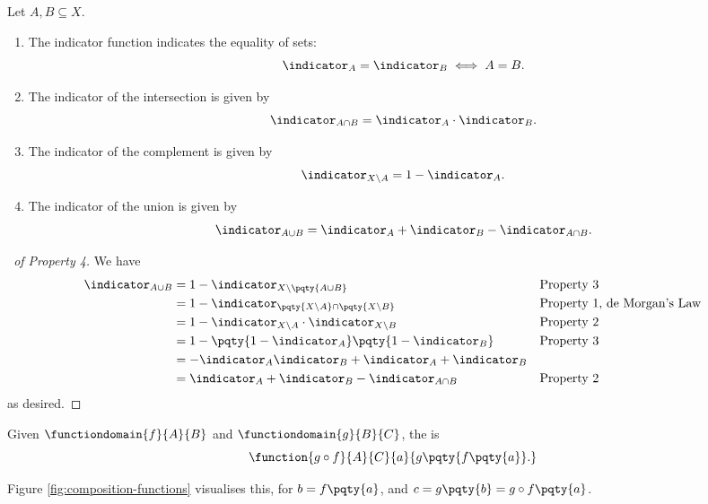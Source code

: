 \begin{proposition}
    Let \(A, B \subseteq X\).
    \begin{enumerate}
        \item The indicator function indicates the equality of sets:
        \[
            \indicator_A = \indicator_B \iff A = B.
        \]
        \item The indicator of the intersection is given by
        \[
            \indicator_{A \cap B} = \indicator_A \cdot \indicator_B.
        \]
        \item The indicator of the complement is given by
        \[
            \indicator_{X \setminus A} = 1 - \indicator_{A}.
        \]
        \item The indicator of the union is given by
        \[
            \indicator_{A \cup B} = \indicator_A + \indicator_B - \indicator_{A \cap B}.
        \]
    \end{enumerate}
\end{proposition}

\begin{proof}[\proofname\ of Property 4]
    We have
    \begin{align*}
        \indicator_{A \cup B} &= 1 - \indicator_{X \setminus \pqty{A \cup B}} && \text{Property 3} \\
        &= 1 - \indicator_{\pqty{X \setminus A} \cap \pqty{X \setminus B}} && \text{Property 1, de Morgan's Law} \\
        &= 1 - \indicator_{X \setminus A} \cdot \indicator_{X \setminus B} && \text{Property 2} \\
        &= 1 - \pqty{1 - \indicator_A} \pqty{1 - \indicator_B} && \text{Property 3} \\
        &= - \indicator_A \indicator_B + \indicator_A + \indicator_B \\
        &= \indicator_A + \indicator_B - \indicator_{A \cap B} && \text{Property 2}
    \end{align*}
    as desired.
\end{proof}

\begin{definition}
    Given \(\functiondomain{f}{A}{B}\) and \(\functiondomain{g}{B}{C}\), the  is
    \[
        \function{g \circ f}{A}{C}{a}{g\pqty{f\pqty{a}}.}
    \]
\end{definition}

Figure \autoref{fig:composition-functions} visualises this, for \(b = f\pqty{a}\), and \(c = g\pqty{b} = g \circ f \pqty{a}\).

